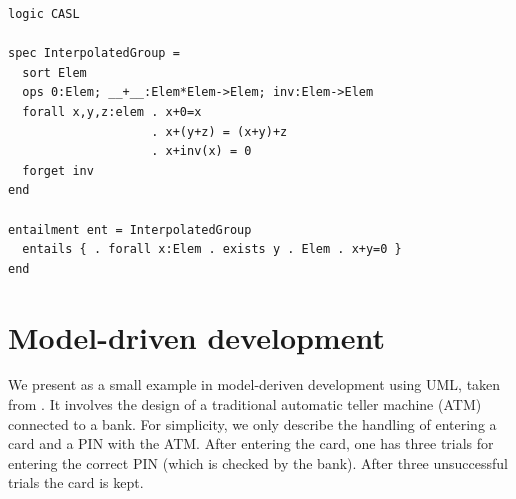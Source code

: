 \documentclass[10pt,fleqn,%
\ifpretendfinal
final%
\else
draft%
\fi,
]{scrreprt}
\newcommand{\sclause}[1]{\section{#1}}
\begin{document}
\begin{lstlisting}[basicstyle=\ttfamily,language=dolText,morekeywords={props,ObjectProperty,Class,DisjointUnionOf,SubClassOf,Characteristics,Transitive,Asymmetric,SubPropertyOf,DisjointClasses,EquivalentTo,inverse,only,forall,iff,if,or,exists,sort,ops,forget,entails,entailment,spec},escapechar=@,mathescape]
logic CASL

spec InterpolatedGroup =
  sort Elem
  ops 0:Elem; __+__:Elem*Elem->Elem; inv:Elem->Elem
  forall x,y,z:elem . x+0=x
                    . x+(y+z) = (x+y)+z
                    . x+inv(x) = 0
  forget inv
end

entailment ent = InterpolatedGroup 
  entails { . forall x:Elem . exists y . Elem . x+y=0 }
end
\end{lstlisting}

\sclause{Model-driven development}

We present as a small example in model-deriven development using UML,
taken from \cite{knapp-mossakowski-roggenbach:corr:2014}.  It involves
the design of a traditional automatic teller machine (ATM) connected
to a bank. For simplicity, we only describe the handling of entering a
card and a PIN with the ATM. After entering the card, one has three
trials for entering the correct PIN (which is checked by the
bank). After three unsuccessful trials the card is kept.
\end{document}
